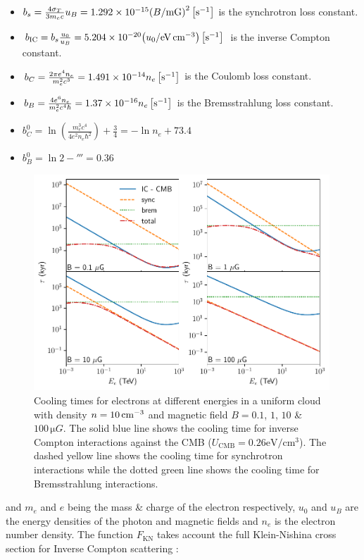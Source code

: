 \begin{itemize}[noitemsep]
	\item $b_s=\frac{4\sigma_T}{3m_ec}u_B=1.292\times 10^{-15}\qty(B/\si{\milli G})^2\,\qty[\persec]$ is the synchrotron loss constant.
	\item $b_\text{IC}=b_s\frac{u_0}{u_B}=5.204\times 10^{-20}\qty(u_0/\si{\electronvolt\per\centi\meter\cubed})\,\qty[\persec]$ is the inverse Compton constant.
	\item $b_C=\frac{2\pi e^4 n_e}{m_e^2 c^3}=1.491\times 10^{-14}n_e\,\qty[\persec]$ is the Coulomb loss constant.
	\item $b_B=\frac{4e^6 n_e}{m_e^2c^4\hbar}=1.37\times 10^{-16}n_e\,\qty[\persec]$ is the Bremsstrahlung loss constant.
	\item $b_C^0=\ln(\frac{m_e^3c^4}{4e^2n_e\hbar^2})+\frac{3}{4}=-\ln n_e+73.4$
	\item $b_B^0=\ln 2-\third=0.36$
\end{itemize}
\begin{figure}[b!]
    \includegraphics[width=0.99\textwidth]{04_Introduction/Images/non_thermal_emission/cooling_time_final.pdf}
    \caption{Cooling times for electrons at different energies in a uniform cloud with density $n=10\,\centimeterminusthree$ and magnetic field $B = 0.1$, $1$, $10$ \& $100\,\si{\micro G}$. The solid blue line shows the cooling time for inverse Compton interactions against the CMB ($U_\text{CMB}=0.26\si{\electronvolt\per\centi\meter\cubed}$). The dashed yellow line shows the cooling time for synchrotron interactions while the dotted green line shows the cooling time for Bremsstrahlung interactions.}
    \label{fig:chapter_1_non_thermal_emission_lep_cooling_losses}
\end{figure}
\noindent and $m_e$ and $e$ being the mass \& charge of the electron respectively, $u_0$ and $u_B$ are the energy densities of the photon and magnetic fields and $n_e$ is the electron number density. The function $F_\text{KN}$ takes account the full Klein-Nishina cross section for Inverse Compton scattering \citep{2007A&A...474..689M}:


